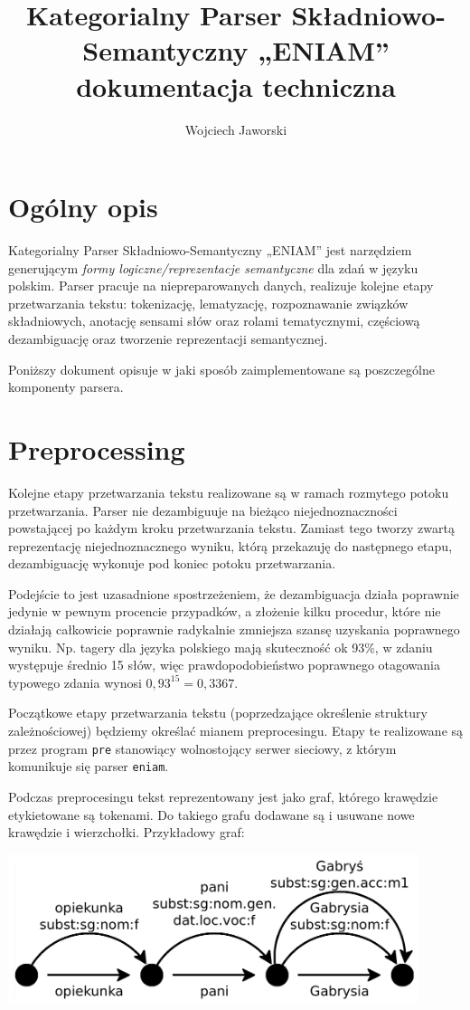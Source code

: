\documentclass[oneside,pwrcover,withmarginpar,hidelinks,11pt]{article}
\title{Kategorialny Parser Składniowo-Semantyczny „ENIAM”\\{\Large dokumentacja techniczna}}
\author{Wojciech Jaworski}
\begin{document}
\maketitle
 
\section{Ogólny opis}

Kategorialny Parser Składniowo-Semantyczny „ENIAM” jest narzędziem generującym {\it formy logiczne/reprezentacje semantyczne} dla zdań w języku polskim. 
Parser pracuje na niepreparowanych danych, realizuje kolejne etapy przetwarzania tekstu: tokenizację, 
lematyzację, rozpoznawanie związków składniowych, anotację sensami słów oraz rolami tematycznymi, 
częściową dezambiguację oraz tworzenie reprezentacji semantycznej.

Poniższy dokument opisuje w jaki sposób zaimplementowane są poszczególne komponenty parsera.


\section{Preprocessing}

Kolejne etapy przetwarzania tekstu realizowane są w ramach rozmytego potoku przetwarzania.
Parser nie dezambiguuje na bieżąco niejednoznaczności powstającej po każdym kroku przetwarzania tekstu.
Zamiast tego tworzy zwartą reprezentację niejednoznacznego wyniku, którą przekazuję do następnego etapu,
dezambiguację wykonuje pod koniec potoku przetwarzania.

Podejście to jest uzasadnione spostrzeżeniem, że 
dezambiguacja działa poprawnie jedynie w pewnym procencie przypadków,
a złożenie kilku procedur, które nie działają całkowicie poprawnie radykalnie zmniejsza szansę uzyskania poprawnego wyniku.
Np. tagery dla języka polskiego mają skuteczność ok 93\%, w zdaniu występuje średnio 15 słów, 
więc prawdopodobieństwo poprawnego otagowania typowego zdania wynosi $0,93^{15}=0,3367$.

Początkowe etapy przetwarzania tekstu (poprzedzające określenie struktury zależnościowej)
będziemy określać mianem preprocesingu. Etapy te realizowane są przez program {\tt pre} stanowiący
wolnostojący serwer sieciowy, z którym komunikuje się parser {\tt eniam}.

Podczas preprocesingu tekst reprezentowany jest jako graf, 
którego krawędzie etykietowane są tokenami.
Do takiego grafu dodawane są i usuwane nowe krawędzie i wierzchołki.
Przykładowy graf:
\begin{center}
\includegraphics[width=12cm]{opiekunka.png}
\end{center}
\end{document}
